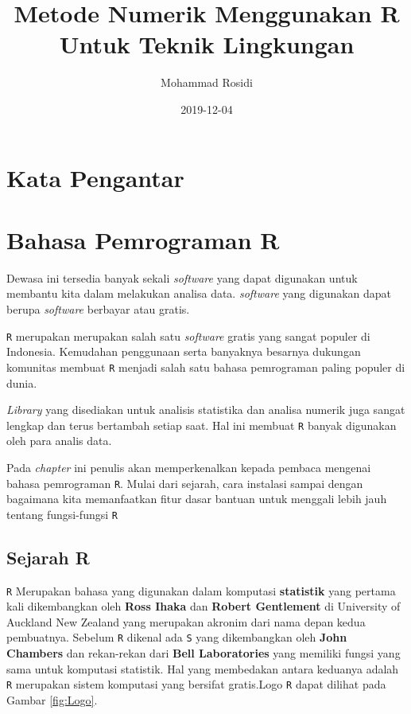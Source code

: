 \documentclass[]{book}
\title{Metode Numerik Menggunakan R Untuk Teknik Lingkungan}
\author{Mohammad Rosidi}
\date{2019-12-04}
\theoremstyle{definition}
\theoremstyle{definition}
\theoremstyle{definition}
\theoremstyle{remark}
\begin{document}
\maketitle

{
\setcounter{tocdepth}{1}
\tableofcontents
}
\hypertarget{kata-pengantar}{%
\chapter*{Kata Pengantar}\label{kata-pengantar}}

\hypertarget{intro}{%
\chapter{Bahasa Pemrograman R}\label{intro}}

Dewasa ini tersedia banyak sekali \emph{software} yang dapat digunakan untuk membantu kita dalam melakukan analisa data. \emph{software} yang digunakan dapat berupa \emph{software} berbayar atau gratis.

\texttt{R} merupakan merupakan salah satu \emph{software} gratis yang sangat populer di Indonesia. Kemudahan penggunaan serta banyaknya besarnya dukungan komunitas membuat \texttt{R} menjadi salah satu bahasa pemrograman paling populer di dunia.

\emph{Library} yang disediakan untuk analisis statistika dan analisa numerik juga sangat lengkap dan terus bertambah setiap saat. Hal ini membuat \texttt{R} banyak digunakan oleh para analis data.

Pada \emph{chapter} ini penulis akan memperkenalkan kepada pembaca mengenai bahasa pemrograman \texttt{R}. Mulai dari sejarah, cara instalasi sampai dengan bagaimana kita memanfaatkan fitur dasar bantuan untuk menggali lebih jauh tentang fungsi-fungsi \texttt{R}

\hypertarget{sejarahR}{%
\section{Sejarah R}\label{sejarahR}}

\texttt{R} Merupakan bahasa yang digunakan dalam komputasi \textbf{statistik} yang pertama kali dikembangkan oleh \textbf{Ross Ihaka} dan \textbf{Robert Gentlement} di University of Auckland New Zealand yang merupakan akronim dari nama depan kedua pembuatnya. Sebelum \texttt{R} dikenal ada \texttt{S} yang dikembangkan oleh \textbf{John Chambers} dan rekan-rekan dari \textbf{Bell Laboratories} yang memiliki fungsi yang sama untuk komputasi statistik. Hal yang membedakan antara keduanya adalah \texttt{R} merupakan sistem komputasi yang bersifat gratis.Logo \texttt{R} dapat dilihat pada Gambar \ref{fig:Logo}.
\end{document}
